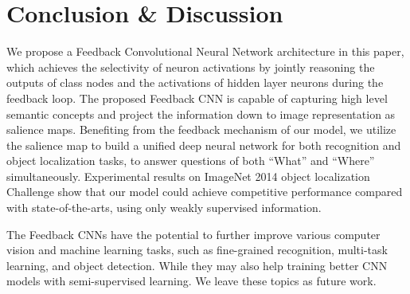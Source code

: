 \section{Conclusion \& Discussion}
\label{sec:conclusion}

We propose a Feedback Convolutional Neural Network architecture in this paper, which achieves the selectivity of neuron activations by jointly reasoning the outputs of class nodes and the activations of hidden layer neurons during the feedback loop. The proposed Feedback CNN is capable of capturing high level semantic concepts and project the information down to image representation as salience maps. Benefiting from the feedback mechanism of our model, we utilize the salience map to build a unified deep neural network for both recognition and object localization tasks, to answer questions of both ``What'' and ``Where'' simultaneously. Experimental results on ImageNet 2014 object localization Challenge show that our model could achieve competitive performance compared with state-of-the-arts, using only weakly supervised information.

The Feedback CNNs have the potential to further improve various computer vision and machine learning tasks, such as fine-grained recognition, multi-task learning, and object detection. While they may also help training better CNN models with semi-supervised learning. We leave these topics as future work. 


